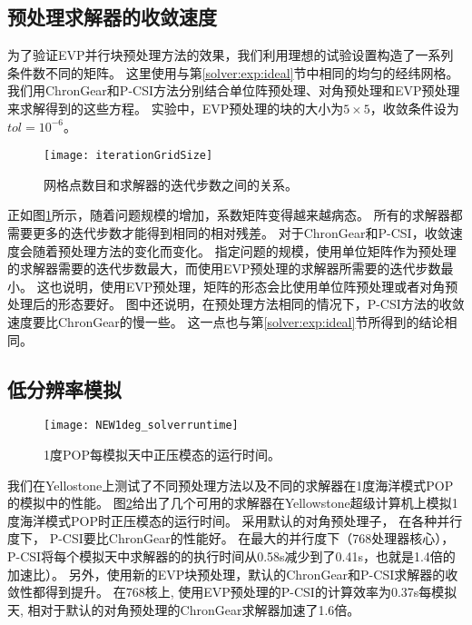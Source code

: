 \subsection{预处理求解器的收敛速度}\label{precond:exp:ideal}

为了验证EVP并行块预处理方法的效果，我们利用理想的试验设置构造了一系列条件数不同的矩阵。
这里使用与第\ref{solver:exp:ideal}节中相同的均匀的经纬网格。
我们用ChronGear和P-CSI方法分别结合单位阵预处理、对角预处理和EVP预处理来求解得到的这些方程。
实验中，EVP预处理的块的大小为$5\times5$，收敛条件设为$tol = 10^{-6}$。 
 

\begin{figure} 
\vspace{5pt}
\centering
\texttt{[image: iterationGridSize]}
\caption[] {网格点数目和求解器的迭代步数之间的关系。\label{fig:iterationGridSizePrecond}}
\end{figure}

正如图\ref{fig:iterationGridSizePrecond}所示，随着问题规模的增加，系数矩阵变得越来越病态。
所有的求解器都需要更多的迭代步数才能得到相同的相对残差。
对于ChronGear和P-CSI，收敛速度会随着预处理方法的变化而变化。 
指定问题的规模，使用单位矩阵作为预处理的求解器需要的迭代步数最大，而使用EVP预处理的求解器所需要的迭代步数最小。 
这也说明，使用EVP预处理，矩阵的形态会比使用单位阵预处理或者对角预处理后的形态要好。 
图中还说明，在预处理方法相同的情况下，P-CSI方法的收敛速度要比ChronGear的慢一些。 
这一点也与第\ref{solver:exp:ideal}节所得到的结论相同。 


\subsection{低分辨率模拟}
\label{precond:exp:low}
\begin {figure}[ht]
\centering
\texttt{[image: NEW1deg\_solverruntime]}
\caption []{1度POP每模拟天中正压模态的运行时间。\label {fig:runtime1}}
\end {figure}
我们在Yellostone上测试了不同预处理方法以及不同的求解器在1度海洋模式POP的模拟中的性能。
图\ref{fig:runtime1}给出了几个可用的求解器在Yellowstone超级计算机上模拟1度海洋模式POP时正压模态的运行时间。  
采用默认的对角预处理子， 在各种并行度下， P-CSI要比ChronGear的性能好。
在最大的并行度下（768处理器核心），P-CSI将每个模拟天中求解器的的执行时间从0.58s减少到了0.41s，也就是1.4倍的加速比）。 
另外，使用新的EVP块预处理，默认的ChronGear和P-CSI求解器的收敛性都得到提升。 
在768核上, 使用EVP预处理的P-CSI的计算效率为0.37s每模拟天, 相对于默认的对角预处理的ChronGear求解器加速了1.6倍。 




